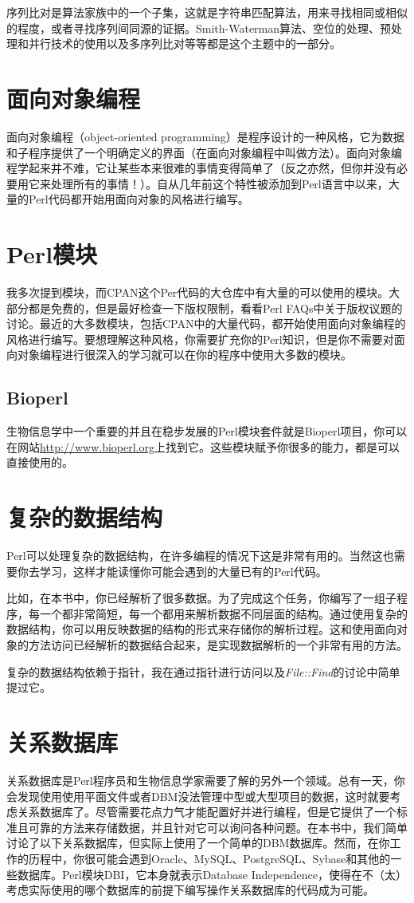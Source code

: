 序列比对是算法家族中的一个子集，这就是字符串匹配算法，用来寻找相同或相似的程度，或者寻找序列间同源的证据。Smith-Waterman算法、空位的处理、预处理和并行技术的使用以及多序列比对等等都是这个主题中的一部分。

\section{面向对象编程}
面向对象编程（object-oriented programming）是程序设计的一种风格，它为数据和子程序提供了一个明确定义的界面（在面向对象编程中叫做方法）。面向对象编程学起来并不难，它让某些本来很难的事情变得简单了（反之亦然，但你并没有必要用它来处理所有的事情！）。自从几年前这个特性被添加到Perl语言中以来，大量的Perl代码都开始用面向对象的风格进行编写。

\section{Perl模块}
我多次提到模块，而CPAN这个Per代码的大仓库中有大量的可以使用的模块。大部分都是免费的，但是最好检查一下版权限制，看看Perl FAQs中关于版权议题的讨论。最近的大多数模块，包括CPAN中的大量代码，都开始使用面向对象编程的风格进行编写。要想理解这种风格，你需要扩充你的Perl知识，但是你不需要对面向对象编程进行很深入的学习就可以在你的程序中使用大多数的模块。 

\subsection{Bioperl}
生物信息学中一个重要的并且在稳步发展的Perl模块套件就是Bioperl项目，你可以在网站\href{http://www.bioperl.org}{http://www.bioperl.org}上找到它。这些模块赋予你很多的能力，都是可以直接使用的。

\section{复杂的数据结构}
Perl可以处理复杂的数据结构，在许多编程的情况下这是非常有用的。当然这也需要你去学习，这样才能读懂你可能会遇到的大量已有的Perl代码。

比如，在本书中，你已经解析了很多数据。为了完成这个任务，你编写了一组子程序，每一个都非常简短，每一个都用来解析数据不同层面的结构。通过使用复杂的数据结构，你可以用反映数据的结构的形式来存储你的解析过程。这和使用面向对象的方法访问已经解析的数据结合起来，是实现数据解析的一个非常有用的方法。

复杂的数据结构依赖于指针，我在通过指针进行访问以及\textit{File::Find}的讨论中简单提过它。

\section{关系数据库}
关系数据库是Perl程序员和生物信息学家需要了解的另外一个领域。总有一天，你会发现使用使用平面文件或者DBM没法管理中型或大型项目的数据，这时就要考虑关系数据库了。尽管需要花点力气才能配置好并进行编程，但是它提供了一个标准且可靠的方法来存储数据，并且针对它可以询问各种问题。在本书中，我们简单讨论了以下关系数据库，但实际上使用了一个简单的DBM数据库。然而，在你工作的历程中，你很可能会遇到Oracle、MySQL、PostgreSQL、Sybase和其他的一些数据库。Perl模块DBI，它本身就表示Database Independence，使得在不（太）考虑实际使用的哪个数据库的前提下编写操作关系数据库的代码成为可能。


